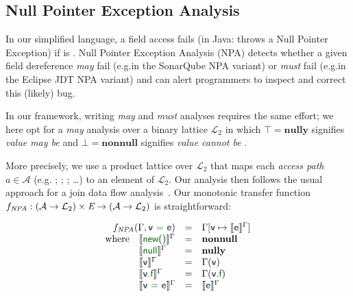 
\subsection{Null Pointer Exception Analysis}
In our simplified language, a field access 
fails (in Java: throws a Null Pointer Exception) if
 is .
Null Pointer Exception Analysis (NPA) detects whether a given field
dereference \emph{may} fail (e.g.\@ in the SonarQube NPA variant)
or \emph{must} fail (e.g.\@ in the Eclipse JDT NPA variant) and can
alert programmers to inspect and correct this (likely) bug.

In our framework, writing \emph{may} and \emph{must} analyses requires
the same effort;  we here opt for a \emph{may} analysis
over a binary lattice $\mathcal{L}_2$
in which $\top = \textbf{nully}$ signifies \emph{value may be } and
$\bot = \textbf{nonnull}$ signifies \emph{value cannot be }.

More precisely, we use a product lattice over $\mathcal{L}_2$ that maps each
\emph{access path} $a \in \mathcal{A}$ (e.g. ; ; ; \ldots)
to an element of $\mathcal{L}_2$.  Our analysis then
follows the usual approach for a join data flow
analysis~\cite{cousot1977ai}. Our monotonic
transfer function
$f_{\textit{NPA}} : (\mathcal{A} \to \mathcal{L}_2) \times \textit{E} \to (\mathcal{A} \to \mathcal{L}_2)$ is straightforward:

\[
\begin{array}{llcl}
\multicolumn{2}{r}{f_{\textit{NPA}}(\Gamma, \vterminal{\vmetavar{v} = \vmetavar{e}})}	&=& \Gamma[\vmetavar{v} \mapsto \semNPA{\vmetavar{e}}^\Gamma] \\
\textrm{where}&\semNPA{\vterminal{new()}}^\Gamma			&=& \textbf{nonnull}\\
&\semNPA{\vterminal{null}}^\Gamma			&=& \textbf{nully}\\
&\semNPA{\vmetavar{v}}^\Gamma				&=& \Gamma(\vmetavar{v})\\
&\semNPA{\vterminal{\vmetavar{v}.f}}^\Gamma		&=& \Gamma(\vmetavar{v}\vterminal{.f})\\
&\semNPA{\vterminal{\vmetavar{v} = \vmetavar{e}}}^\Gamma	&=& \semNPA{\vmetavar{e}}^\Gamma\\
\end{array}
\]

